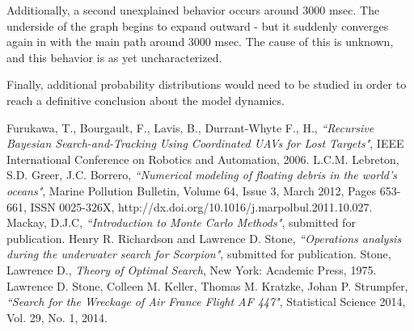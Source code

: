 \documentclass[a4paper]{article}
\begin{document}
Additionally, a second unexplained behavior occurs around 3000 msec. The underside of the graph begins to expand outward - but it suddenly converges again in with the main path around 3000 msec. The cause of this is unknown, and this behavior is as yet uncharacterized. 

Finally, additional probability distributions would need to be studied in order to reach a definitive conclusion about the model dynamics.

\pagebreak

\begin{thebibliography}{10}
 Furukawa, T., Bourgault, F., Lavis, B., Durrant-Whyte F., H., \emph{``Recursive Bayesian Search-and-Tracking Using Coordinated UAVs for Lost Targets"}, IEEE International Conference on Robotics and Automation, 2006. 
 L.C.M. Lebreton, S.D. Greer, J.C. Borrero, \emph{``Numerical modeling of floating debris in the world’s oceans"}, Marine Pollution Bulletin, Volume 64, Issue 3, March 2012, Pages 653-661, ISSN 0025-326X, http://dx.doi.org/10.1016/j.marpolbul.2011.10.027.
 Mackay, D.J.C, \emph{``Introduction to Monte Carlo Methods"}, submitted for publication.
 Henry R. Richardson and Lawrence D. Stone, \emph{``Operations analysis during the underwater search for Scorpion"}, submitted for publication. 
 Stone, Lawrence D., \textit{Theory of Optimal Search}, New York: Academic Press, 1975.
 Lawrence D. Stone, Colleen M. Keller, Thomas M. Kratzke, Johan P. Strumpfer, \emph{``Search for the Wreckage of Air France Flight AF 447"}, Statistical Science 2014, Vol. 29, No. 1, 2014.
\end{thebibliography}
\end{document}
